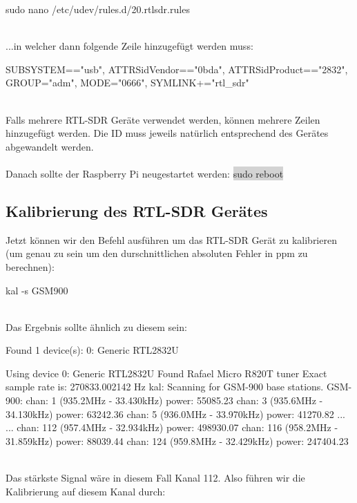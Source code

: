 \documentclass{scrreprt}
\begin{document}
\begin{code}
sudo nano /etc/udev/rules.d/20.rtlsdr.rules
\end{code}

\noindent\\...in welcher dann folgende Zeile hinzugefügt werden muss:

\begin{code}
SUBSYSTEM=="usb", ATTRS{idVendor}=="0bda", ATTRS{idProduct}=="2832", GROUP="adm", MODE="0666", SYMLINK+="rtl_sdr"
\end{code}

\noindent\\Falls mehrere RTL-SDR Geräte verwendet werden, können mehrere Zeilen hinzugefügt werden. Die ID muss jeweils natürlich entsprechend des Gerätes abgewandelt werden.\\
\\Danach sollte der Raspberry Pi neugestartet werden: \colorbox{lightgray}{sudo reboot}

\subsection{Kalibrierung des RTL-SDR Gerätes}
Jetzt können wir den Befehl ausführen um das RTL-SDR Gerät zu kalibrieren (um genau zu sein um den durschnittlichen absoluten Fehler in ppm zu berechnen):

\begin{code}
kal -s GSM900 
\end{code}

\noindent\\Das Ergebnis sollte ähnlich zu diesem sein:

\begin{code}
Found 1 device(s):
  0:  Generic RTL2832U

Using device 0: Generic RTL2832U
Found Rafael Micro R820T tuner
Exact sample rate is: 270833.002142 Hz
kal: Scanning for GSM-900 base stations.
GSM-900:
	chan: 1 (935.2MHz - 33.430kHz)	power: 55085.23
	chan: 3 (935.6MHz - 34.130kHz)	power: 63242.36
	chan: 5 (936.0MHz - 33.970kHz)	power: 41270.82
...
...
	chan: 112 (957.4MHz - 32.934kHz)	power: 498930.07
	chan: 116 (958.2MHz - 31.859kHz)	power: 88039.44
	chan: 124 (959.8MHz - 32.429kHz)	power: 247404.23
\end{code}

\noindent\\Das stärkste Signal wäre in diesem Fall Kanal 112. Also führen wir die Kalibrierung auf diesem Kanal durch:
\end{document}
